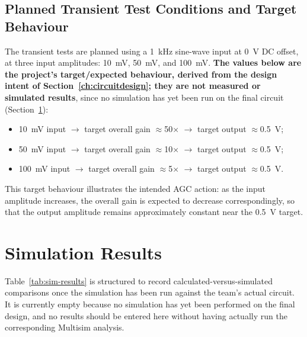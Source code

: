 

\subsection{Planned Transient Test Conditions and Target Behaviour}

The transient tests are planned using a 1~kHz sine-wave input at 0~V DC offset, at three input amplitudes: 10~mV, 50~mV, and 100~mV. \textbf{The values below are the project's target/expected behaviour, derived from the design intent of Section~\ref{ch:circuitdesign}; they are not measured or simulated results}, since no simulation has yet been run on the final circuit (Section~\ref{sec:sim-results-empty}):

\begin{itemize}
    \item 10~mV input $\rightarrow$ target overall gain $\approx$50$\times$ $\rightarrow$ target output $\approx$0.5~V;
    \item 50~mV input $\rightarrow$ target overall gain $\approx$10$\times$ $\rightarrow$ target output $\approx$0.5~V;
    \item 100~mV input $\rightarrow$ target overall gain $\approx$5$\times$ $\rightarrow$ target output $\approx$0.5~V.
\end{itemize}

This target behaviour illustrates the intended AGC action: as the input amplitude increases, the overall gain is expected to decrease correspondingly, so that the output amplitude remains approximately constant near the 0.5~V target.

\section{Simulation Results}
\label{sec:sim-results-empty}

Table~\ref{tab:sim-results} is structured to record calculated-versus-simulated comparisons once the simulation has been run against the team's actual circuit. It is currently empty because no simulation has yet been performed on the final design, and no results should be entered here without having actually run the corresponding Multisim analysis.




